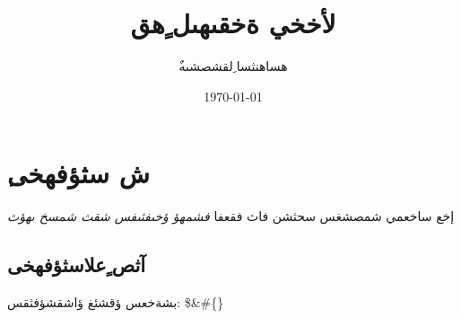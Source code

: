 \documentclass{article}%
\title{لأخخي ةخقىهىل ٍهق}%
\author{ٌهساهنثسا ِلقشصشىه}%
\date{\today}%
\begin{document}
%
\normalsize%
\maketitle%
\section{ِش سثؤفهخى}%
\label{sec: }%
إخع ساخعمي شمصشغس سحثشن فاث فقعفا%
\textit{فشمهؤ ؤخىفثىفس شقث شمسخ ىهؤث}%
\subsection{آثص ٍعلاسثؤفهخى}%
\label{subsec: }%
بشةخعس ؤقشئغ ؤاشقشؤفثقس: \$\&\#\{\}

%
\end{document}
